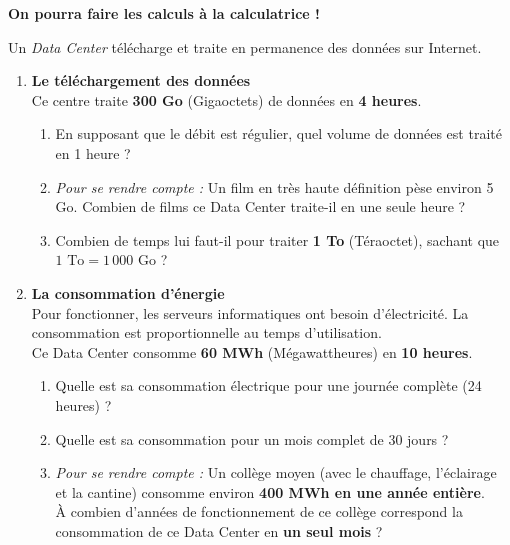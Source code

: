 \documentclass[a4paper]{book}
\begin{document}
{    
    \begin{exercice} 
        \textbf{On pourra faire les calculs à la calculatrice !}
        
        Un \textit{Data Center} télécharge et traite en permanence des données sur Internet. 
        
        \begin{enumerate}
            \item \textbf{Le téléchargement des données} \\
            Ce centre traite \textbf{300 Go} (Gigaoctets) de données en \textbf{4 heures}.
            \begin{enumerate}
                \item En supposant que le débit est régulier, quel volume de données est traité en 1 heure ?
                \item \textit{Pour se rendre compte :} Un film en très haute définition pèse environ 5 Go. Combien de films ce Data Center traite-il en une seule heure ?
                \item Combien de temps lui faut-il pour traiter \textbf{1 To} (Téraoctet), sachant que $1 \text{ To} = 1\,000 \text{ Go}$ ?
            \end{enumerate}
            
            \item \textbf{La consommation d'énergie} \\
            Pour fonctionner, les serveurs informatiques ont besoin d'électricité. La consommation est proportionnelle au temps d'utilisation. \\
            Ce Data Center consomme \textbf{60 MWh} (Mégawattheures) en \textbf{10 heures}.
            \begin{enumerate}
                \item Quelle est sa consommation électrique pour une journée complète (24 heures) ?
                \item Quelle est sa consommation pour un mois complet de 30 jours ?
                \item \textit{Pour se rendre compte :} Un collège moyen (avec le chauffage, l'éclairage et la cantine) consomme environ \textbf{400 MWh en une année entière}. \\
                À combien d'années de fonctionnement de ce collège correspond la consommation de ce Data Center en \textbf{un seul mois} ?
            \end{enumerate}
        \end{enumerate}
    \end{exercice}

}
\end{document}

